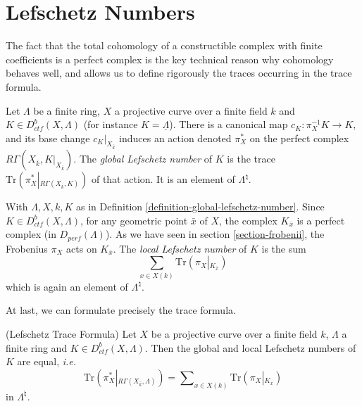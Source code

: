 \section{Lefschetz Numbers}
\label{section-lefschetz-numbers}

\noindent
The fact that the total cohomology of a constructible complex with finite
coefficients is a perfect complex is the key technical reason why cohomology
behaves well, and allows us to define rigorously the traces occurring in the
trace formula.

\begin{definition}
\label{definition-global-lefschetz-number}
Let $\Lambda$ be a finite ring, $X$ a projective curve over a finite field $k$
and $K \in D_{ctf}^b(X, \Lambda)$ (for instance $K = \underline\Lambda$).
There is a canonical map $c_K : \pi_X^{-1}K \to K$, and its base change
$c_K|_{X_{\bar k}}$ induces an action denoted $\pi_X^*$ on the perfect
complex $R\Gamma(X_{\bar k}, K|_{X_{\bar k}})$. The
{\it global Lefschetz number} of $K$ is the trace $
\text{Tr}(\pi_X^*\left|_{R\Gamma(X_{\bar k}, K)}\right.)$ of that action.
It is an element of $\Lambda^\natural$.
\end{definition}

\begin{definition}
\label{definition-local-lefschetz-number}
With $\Lambda, X, k, K$ as in
Definition \ref{definition-global-lefschetz-number}.
Since $K\in D_{ctf}^b (X, \Lambda)$, for any geometric point $\bar x$ of $X$,
the complex $K_{\bar x}$ is a perfect complex (in $D_{perf}(\Lambda)$). As we
have seen in section \ref{section-frobenii}, the Frobenius $\pi_X$ acts on
$K_{\bar x}$. The {\it local Lefschetz number} of $K$ is the sum
$$
\sum_{x\in X(k)} \text{Tr}(\pi_X \left|_{K_{\overline x}}\right.)
$$
which is again an element of $\Lambda^\natural$.
\end{definition}

\noindent
At last, we can formulate precisely the trace formula.

\begin{theorem}
\label{theorem-trace}
(Lefschetz Trace Formula)
Let $X$ be a projective curve over a finite field $k$, $\Lambda$ a finite ring
and $K \in D_{ctf}^b(X,\Lambda)$. Then the global and local Lefschetz numbers
of $K$ are equal, {\it i.e.}
\begin{equation}
\label{equation-trace-formula}
\text{Tr}(\pi^*_X\left|_{R\Gamma(X_{\bar k}, \Lambda)}\right.)
=
\sum\nolimits_{x\in X(k)} \text{Tr}(\pi_X\left|_{K_{\bar x}}\right.)
\end{equation}
in $\Lambda^\natural$.
\end{theorem}

